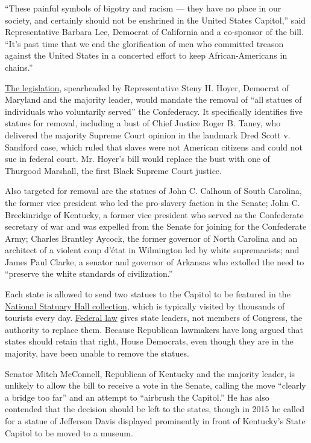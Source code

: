 ``These painful symbols of bigotry and racism --- they have no place in
our society, and certainly should not be enshrined in the United States
Capitol,'' said Representative Barbara Lee, Democrat of California and a
co-sponsor of the bill. ``It's past time that we end the glorification
of men who committed treason against the United States in a concerted
effort to keep African-Americans in chains.''

\href{https://docs.house.gov/billsthisweek/20200720/BILLS-116hr7573-SUSv2.pdf}{The
legislation}, spearheaded by Representative Steny H. Hoyer, Democrat of
Maryland and the majority leader, would mandate the removal of ``all
statues of individuals who voluntarily served'' the Confederacy. It
specifically identifies five statues for removal, including a bust of
Chief Justice Roger B. Taney, who delivered the majority Supreme Court
opinion in the landmark Dred Scott v. Sandford case, which ruled that
slaves were not American citizens and could not sue in federal court.
Mr. Hoyer's bill would replace the bust with one of Thurgood Marshall,
the first Black Supreme Court justice.

Also targeted for removal are the statues of John C. Calhoun of South
Carolina, the former vice president who led the pro-slavery faction in
the Senate; John C. Breckinridge of Kentucky, a former vice president
who served as the Confederate secretary of war and was expelled from the
Senate for joining for the Confederate Army; Charles Brantley Aycock,
the former governor of North Carolina and an architect of a violent coup
d'état in Wilmington led by white supremacists; and James Paul Clarke, a
senator and governor of Arkansas who extolled the need to ``preserve the
white standards of civilization.''

Each state is allowed to send two statues to the Capitol to be featured
in the
\href{https://www.aoc.gov/explore-capitol-campus/art/about-national-statuary-hall-collection}{National
Statuary Hall collection}, which is typically visited by thousands of
tourists every day.
\href{https://uscode.house.gov/view.xhtml?req=\%28title:2\%20section:2132\%20edition:prelim\%29}{Federal
law} gives state leaders, not members of Congress, the authority to
replace them. Because Republican lawmakers have long argued that states
should retain that right, House Democrats, even though they are in the
majority, have been unable to remove the statues.

Senator Mitch McConnell, Republican of Kentucky and the majority leader,
is unlikely to allow the bill to receive a vote in the Senate, calling
the move ``clearly a bridge too far'' and an attempt to ``airbrush the
Capitol.'' He has also contended that the decision should be left to the
states, though in 2015 he called for a statue of Jefferson Davis
displayed prominently in front of Kentucky's State Capitol to be moved
to a museum.

